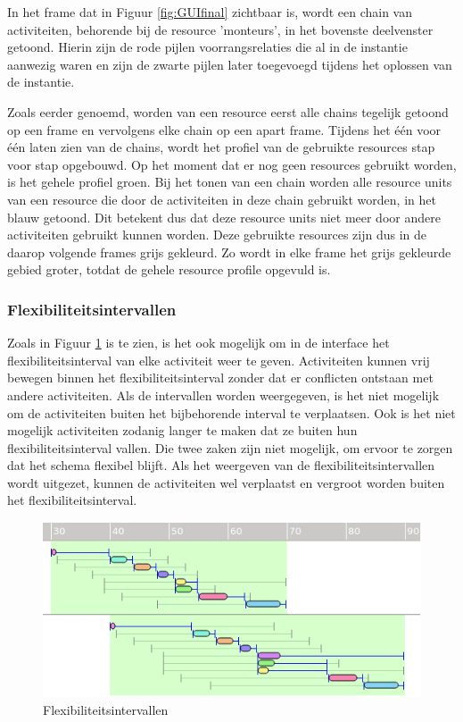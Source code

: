 In het frame dat in Figuur \ref{fig:GUIfinal} zichtbaar is, wordt een chain van activiteiten, behorende bij de resource 'monteurs', in het bovenste deelvenster getoond. Hierin zijn de rode pijlen voorrangsrelaties die al in de instantie aanwezig waren en zijn de zwarte pijlen later toegevoegd tijdens het oplossen van de instantie.

Zoals eerder genoemd, worden van een resource eerst alle chains tegelijk getoond op een frame en vervolgens elke chain op een apart frame. Tijdens het \'e\'en voor \'e\'en laten zien van de chains, wordt  het profiel van de gebruikte resources stap voor stap opgebouwd. Op het moment dat er nog geen resources gebruikt worden, is het gehele profiel groen. Bij het tonen van een chain worden alle resource units van een resource die door de activiteiten in deze chain gebruikt worden, in het blauw getoond. Dit betekent dus dat deze resource units niet meer door andere activiteiten gebruikt kunnen worden. Deze gebruikte resources zijn dus in de daarop volgende frames grijs gekleurd. Zo wordt in elke frame het grijs gekleurde gebied groter, totdat de gehele resource profile opgevuld is.

\subsubsection{Flexibiliteitsintervallen}
Zoals in Figuur \ref{fig:flex-interval} is te zien, is het ook mogelijk om in de interface het flexibiliteitsinterval van elke activiteit weer te geven. Activiteiten kunnen vrij bewegen binnen het flexibiliteitsinterval zonder dat er conflicten ontstaan met andere activiteiten. Als de intervallen worden weergegeven, is het niet mogelijk om de activiteiten buiten het bijbehorende interval te verplaatsen. Ook is het niet mogelijk activiteiten zodanig langer te maken dat ze buiten hun flexibiliteitsinterval vallen. Die twee zaken zijn niet mogelijk, om ervoor te zorgen dat het schema flexibel blijft. Als het weergeven van de flexibiliteitsintervallen wordt uitgezet, kunnen de activiteiten wel verplaatst en vergroot worden buiten het flexibiliteitsinterval.

\begin{figure}[H]
\center
\includegraphics[width=.7\textwidth]{../images/flex-interval.png}
\caption{Flexibiliteitsintervallen}
\label{fig:flex-interval}
\end{figure}

